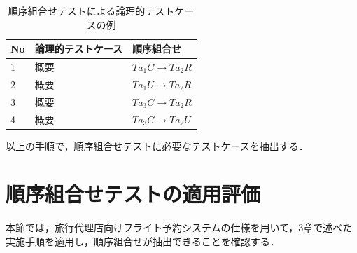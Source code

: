 \documentclass[a4paper,12pt]{jreport}
\begin{document}


\begin{table}[t]
  \centering
  \caption{順序組合せテストによる論理的テストケースの例}
    \begin{tabular}{l|l|l}
    No & 論理的テストケース & 順序組合せ \\
    \hline
    1 & 概要 & $Ta_1C \rightarrow Ta_2R$ \\
    \hline
    2 & 概要 & $Ta_1U \rightarrow Ta_2R$ \\
    \hline
    3 & 概要 & $Ta_3C \rightarrow Ta_2R$ \\
    \hline
    4 & 概要 & $Ta_3C \rightarrow Ta_2U$ \\
    \hline
    \end{tabular}%
\label{TCLISTSAMPLE}
\end{table}%


以上の手順で，順序組合せテストに必要なテストケースを抽出する．

\section{順序組合せテストの適用評価}
本節では，旅行代理店向けフライト予約システムの仕様を用いて，3章で述べた実施手順を適用し，順序組合せが抽出できることを確認する．
\end{document}

